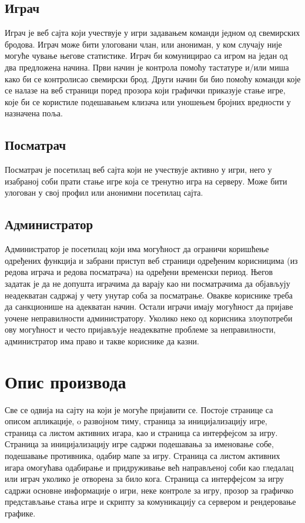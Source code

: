 \subsection{Играч}
Играч је веб сајта који учествује у игри задавањем команди једном од свемирских бродова. Играч може бити улоговани члан, или анониман, у ком случају није могуће чување његове статистике. Играч би комуницирао са игром на један од два предложена начина. Први начин је контрола помоћу тастатуре и/или миша како би се контролисао свемирски брод. Други начин би био помоћу команди које се налазе на веб страници поред прозора који графички приказује стање игре, које би се користиле подешавањем клизача или уношењем бројних вредности у назначена поља.

\subsection{Посматрач}
Посматрач је посетилац веб сајта који не учествује активно у игри, него у изабраној соби прати стање игре која се тренутно игра на серверу. Може бити улогован у свој профил или анонимни посетилац сајта.

\subsection{Администратор}
Администратор је посетилац који има могућност да ограничи коришћење одређених функција и забрани приступ  веб страници одређеним корисницима (из редова играча и редова посматрача) на одређени временски период. Његов задатак је да не допушта играчима да варају као ни посматрачима да објављују неадекватан садржај у чету унутар соба за посматрање. Овакве кориснике треба да санкционише на адекватан начин. Остали играчи имају могућност да пријаве уочене неправилности администратору. Уколико неко од корисника злоупотреби ову могућност и често пријављује неадекватне проблеме за неправилности, администратор има право и такве кориснике да казни.

\section{Опис производа}
Све се одвија на сајту на који је могуће пријавити се. Постоје странице са описом апликације, o развојном тиму, страница за иницијализацију игре, страница са листом активних игара, као и страница са интерфејсом за игру.
Страница за иницијализацију игре садржи подешавања за именовање собе, подешавање противника, одабир мапе за игру.
Страница са листом активних игара омогућава одабирање и придруживање већ направљеној соби као гледалац или играч уколико је отворена за било кога.
Страница са интерфејсом за игру садржи основне информације о игри, неке контроле за игру, прозор за графичко представљање стања игре и скрипту за комуникацију са сервером и рендеровање графике.


